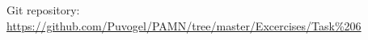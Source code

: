 \appendix
 \chapter{}
 Git repository: \href{https://github.com/Puvogel/PAMN/tree/master/Excercises/Task%206}{https://github.com/Puvogel/PAMN/tree/master/Excercises/Task\%206}


